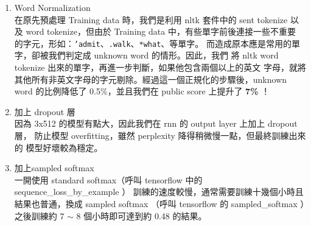 \documentclass[12pt, a4paper]{article}
\theoremstyle{mystyle}	%
\begin{document}
\begin{enumerate}
  \item Word Normalization\\
    在原先預處理 Training data 時，我們是利用 nltk 套件中的 sent tokenize
    以及 word tokenize，但由於 Training data 中，有些單字前後連接一些不重要
    的字元，形如：\texttt{'admit}、\texttt{.walk}、\texttt{*what}、等單字。
    而造成原本應是常用的單字，卻被我們判定成 unknown word 的情形。因此，我們
    將 nltk word tokenize 出來的單字，再進一步判斷，如果他包含兩個以上的英文
    字母，就將其他所有非英文字母的字元剔除。經過這一個正規化的步驟後，unknown
    word 的比例降低了 0.5\%，並且我們在 public score 上提升了 \textbf{7\%} ！
  \item 加上 dropout 層 \\
    因為 3x512 的模型有點大，因此我們在 rnn 的 output layer 上加上 dropout 層，
    防止模型 overfitting，雖然 perplexity 降得稍微慢一點，但最終訓練出來的
    模型好壞較為穩定。
  \item 加上sampled softmax\\
    一開使用 standard softmax（呼叫 tensorflow 中的 sequence\_loss\_by\_example ）
    訓練的速度較慢，通常需要訓練十幾個小時且結果也普通，換成 sampled softmax
    （呼叫 tensorflow 的 sampled\_softmax ）之後訓練約 7 $\sim$ 8 個小時即可達到約 0.48 的結果。
\end{enumerate}
\end{document}
